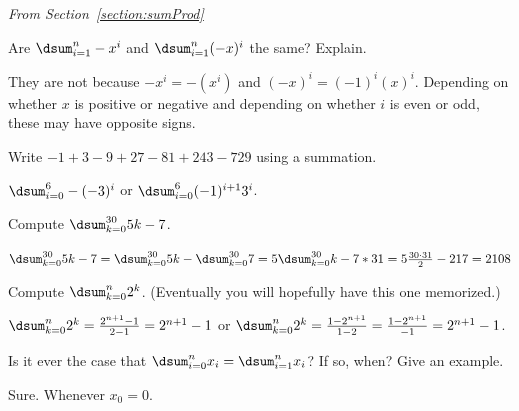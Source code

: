 \noindent
{\em From Section~\ref{section:sumProd}}

\begin{requ}
Are $\dsum_{i=1}^{n} -x^i$ and $\dsum_{i=1}^{n} (-x)^i$ the same? Explain.
\begin{requanswer}
They are not because $-x^i=-(x^i)$ and $(-x)^i=(-1)^i(x)^i$. Depending on whether $x$ is positive or negative
and depending on whether $i$ is even or odd, these may have opposite signs.
\end{requanswer}
\end{requ}

\begin{requ}
Write $-1+3-9+27-81+243-729$ using a summation.
\begin{requanswer}
$\dsum_{i=0}^6 -(-3)^i$ or $\dsum_{i=0}^6 (-1)^{i+1}3^i$.
\end{requanswer}
\end{requ}

\begin{requ}
Compute $\dsum_{k=0}^{30} 5k-7$.
\begin{requanswer}
$\dsum_{k=0}^{30} 5k-7 = \dsum_{k=0}^{30} 5k - \dsum_{k=0}^{30} 7=5\dsum_{k=0}^{30} k - 7*31
=5\frac{30\cdot 31}{2} - 217 = 2108$
\end{requanswer}
\end{requ}

\begin{requ}
Compute $\dsum_{k=0}^{n} 2^k$. (Eventually you will hopefully have this one memorized.)
\begin{requanswer}
$\dsum_{k=0}^{n} 2^k = \frac{2^{n+1} -1}{2-1} = 2^{n+1}-1$ 
or 
$\dsum_{k=0}^{n} 2^k = \frac{1 - 2^{n+1}}{1 - 2} = \frac{1-2^{n+1}}{-1} = 2^{n+1}-1$. 
\end{requanswer}
\end{requ}

\begin{requ}
Is it ever the case that $\dsum_{i=0}^{n} x_i=\dsum_{i=1}^{n} x_i$? If so, when?
Give an example.
\begin{requanswer}
Sure. Whenever $x_0=0$.
\end{requanswer}
\end{requ}


